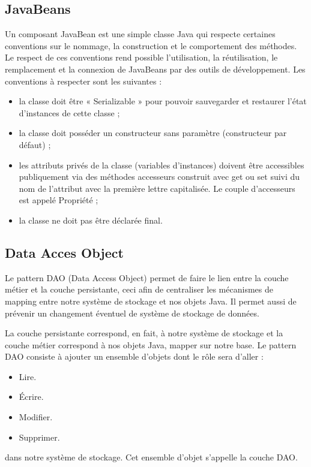 \subsection{JavaBeans}
Un composant JavaBean est une simple classe Java qui respecte certaines conventions sur le nommage, la construction et le comportement des méthodes. Le respect de ces conventions rend possible l'utilisation, la réutilisation, le remplacement et la connexion de JavaBeans par des outils de développement.
\bigbreak
Les conventions à respecter sont les suivantes :
\bigbreak
\begin{itemize}
    \item la classe doit être « Serializable » pour pouvoir sauvegarder et restaurer l'état d'instances de cette classe ;
    \item la classe doit posséder un constructeur sans paramètre (constructeur par défaut) ;
    \item les attributs privés de la classe (variables d'instances) doivent être accessibles publiquement via des méthodes accesseurs construit avec get ou set suivi du nom de l'attribut avec la première lettre capitalisée. Le couple d’accesseurs est appelé Propriété ;
    \item la classe ne doit pas être déclarée final.
\end{itemize}


\subsection{Data Acces Object}
Le pattern DAO (Data Access Object) permet de faire le lien entre la couche métier et la couche persistante, ceci afin de centraliser les mécanismes de mapping entre notre système de stockage et nos objets Java. Il permet aussi de prévenir un changement éventuel de système de stockage de données.

La couche persistante correspond, en fait, à notre système de stockage et la couche métier correspond à nos objets Java, mapper sur notre base. Le pattern DAO consiste à ajouter un ensemble d'objets dont le rôle sera d'aller :
\bigbreak
\begin{itemize}
    \item Lire.
    \item Écrire.
    \item Modifier.
    \item Supprimer.
\end{itemize}
\bigbreak
dans notre système de stockage. Cet ensemble d'objet s'appelle la couche DAO.
